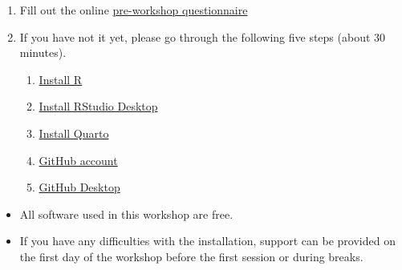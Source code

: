 \documentclass[
  letterpaper,
  DIV=11,
  numbers=noendperiod]{scrreprt}
\providecommand{\tightlist}{%
  \setlength{\itemsep}{0pt}\setlength{\parskip}{0pt}}\usepackage{longtable,booktabs,array}
\begin{document}
\begin{enumerate}
\def\labelenumi{\arabic{enumi}.}
\item
  Fill out the online
  \href{https://timicodktest.smartforest.de/-/single/cac06e76b3e163e655e49626f8129de8f55a8035ced54f15bc4c6cf527dba8a7?st=DnBRz677PIYh33ML0rE1amWzyhCIYPGFQnmZ6AAou8nJFyikWN6nLM5i3G4I0YZN}{pre-workshop
  questionnaire}
\item
  If you have not it yet, please go through the following five steps
  (about 30 minutes).

  \begin{enumerate}
  \def\labelenumii{\alph{enumii}.}
  \item
    \href{https://thaliehln.github.io/ds4ph/installations.html\#sec-R-installation}{Install
    R}
  \item
    \href{https://thaliehln.github.io/ds4ph/installations.html\#sec-RStudio-installation}{Install
    RStudio Desktop}
  \item
    \href{https://thaliehln.github.io/ds4ph/installations.html\#install-quarto}{Install
    Quarto}
  \item
    \href{https://thaliehln.github.io/ds4ph/installations.html\#github-account}{GitHub
    account}
  \item
    \href{https://thaliehln.github.io/ds4ph/installations.html\#github-desktop}{GitHub
    Desktop}
  \end{enumerate}
\end{enumerate}

\begin{tcolorbox}[enhanced jigsaw, leftrule=.75mm, breakable, coltitle=black, opacitybacktitle=0.6, colframe=quarto-callout-note-color-frame, bottomrule=.15mm, toptitle=1mm, left=2mm, opacityback=0, colbacktitle=quarto-callout-note-color!10!white, rightrule=.15mm, bottomtitle=1mm, arc=.35mm, titlerule=0mm, title=\textcolor{quarto-callout-note-color}{\faInfo}\hspace{0.5em}{Note}, toprule=.15mm, colback=white]

\begin{itemize}
\tightlist
\item
  All software used in this workshop are free.
\item
  If you have any difficulties with the installation, support can be
  provided on the first day of the workshop before the first session or
  during breaks.
\end{itemize}

\end{tcolorbox}
\end{document}

